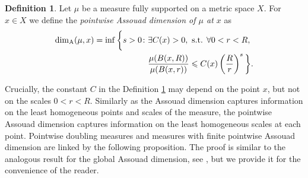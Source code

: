 \documentclass{PRM}
\theoremstyle{plain}
\theoremstyle{definition}
\newtheorem{defn}[thm]{Definition}
\theoremstyle{remark}
\begin{document}
\begin{defn}\label{def:loc_assouad}
Let $\mu$ be a measure fully supported on a metric space $X$. For $x\in X$ we define the \emph{pointwise Assouad dimension of $\mu$ at $x$} as
\begin{align*}
    \dim_{\mathrm{A}}(\mu,x)=\inf\bigg\{s>0\colon &\exists C(x)>0,\textnormal{ s.t. }\forall0<r<R,\\
    &\frac{\mu(B(x,R))}{\mu(B(x,r))}\leq C(x)\left(\frac{R}{r}\right)^s\bigg\}.
\end{align*}
\end{defn}
Crucially, the constant $C$ in the Definition \ref{def:loc_assouad} may depend on the point $x$, but not on the scales $0<r<R$. Similarly as the Assouad dimension captures information on the least homogeneous points and scales of the measure, the pointwise Assouad dimension captures information on the least homogeneous scales at each point. Pointwise doubling measures and measures with finite pointwise Assouad dimension are linked by the following proposition. The proof is similar to the analogous result for the global Assouad dimension, see \cite[Lemma 4.1.1]{F}, but we provide it for the convenience of the reader.
\end{document}

